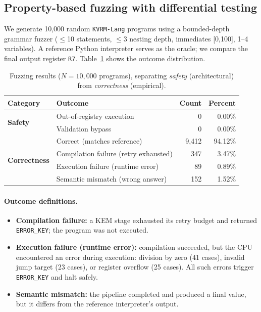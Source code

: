 \documentclass[11pt]{article}
\begin{document}
\subsection{Property-based fuzzing with differential testing}
We generate 10{,}000 random \texttt{KVRM-Lang} programs using a bounded-depth grammar fuzzer ($\leq$10 statements, $\leq$3 nesting depth, immediates [0,100], 1--4 variables).
A reference Python interpreter serves as the oracle; we compare the final output register \texttt{R7}.
Table~\ref{tab:fuzz} shows the outcome distribution.

\begin{table}[h]
\centering
\caption{Fuzzing results ($N=10{,}000$ programs), separating \emph{safety} (architectural) from \emph{correctness} (empirical).}
\label{tab:fuzz}
\begin{tabular}{llrr}
\toprule
Category & Outcome & Count & Percent \\
\midrule
\multirow{2}{*}{\textbf{Safety}} & Out-of-registry execution & 0 & 0.00\% \\
 & Validation bypass & 0 & 0.00\% \\
\midrule
\multirow{4}{*}{\textbf{Correctness}} & Correct (matches reference) & 9{,}412 & 94.12\% \\
 & Compilation failure (retry exhausted) & 347 & 3.47\% \\
 & Execution failure (runtime error) & 89 & 0.89\% \\
 & Semantic mismatch (wrong answer) & 152 & 1.52\% \\
\bottomrule
\end{tabular}
\end{table}

\paragraph{Outcome definitions.}
\begin{itemize}[leftmargin=*]
  \item \textbf{Compilation failure:} a KEM stage exhausted its retry budget and returned \texttt{ERROR\_KEY}; the program was not executed.
  \item \textbf{Execution failure (runtime error):} compilation succeeded, but the CPU encountered an error during execution: division by zero (41 cases), invalid jump target (23 cases), or register overflow (25 cases). All such errors trigger \texttt{ERROR\_KEY} and halt safely.
  \item \textbf{Semantic mismatch:} the pipeline completed and produced a final value, but it differs from the reference interpreter's output.
\end{itemize}
\end{document}
